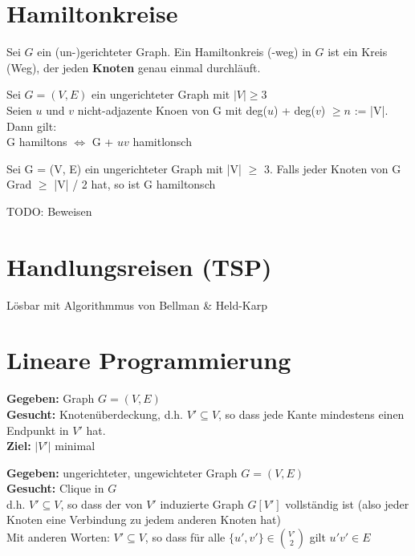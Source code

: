 \documentclass[14pt]{article}
\begin{document}
    \section{Hamiltonkreise}
    \begin{definition}
        Sei $G$ ein (un-)gerichteter Graph. Ein Hamiltonkreis (-weg)
        in $G$ ist ein Kreis (Weg), der jeden \textbf{Knoten} genau
        einmal durchläuft.
    \end{definition}
    \begin{eigenschaft}
        Sei $G = (V, E)$ ein ungerichteter Graph mit $|V| \geq 3$ \\
        Seien $u$ und $v$ nicht-adjazente Knoen von G mit deg($u$)
        + deg($v$) $\geq n$ := |V|. Dann gilt: \\
        \indent G hamiltons $\Leftrightarrow$ G + $uv$ hamitlonsch 
    \end{eigenschaft}
    \begin{eigenschaft}
        Sei G = (V, E) ein ungerichteter Graph mit |V| $\geq$ 3.
        Falls jeder Knoten von G Grad $\geq$ |V| / 2 hat, so ist 
        G hamiltonsch
    \end{eigenschaft}
    TODO: Beweisen

    \section{Handlungsreisen (TSP)}
    Lösbar mit Algorithmmus von Bellman \& Held-Karp

    \section{Lineare Programmierung}
        \begin{definition}[Knotenüberdeckung]
            \textbf{Gegeben:} Graph $G = (V, E)$ \\
            \textbf{Gesucht:} Knotenüberdeckung, d.h. $V' 
            \subseteq V$, so dass jede Kante mindestens einen 
            Endpunkt in $V'$ hat. \\
            \textbf{Ziel:} $|V'|$ minimal
        \end{definition}
        \begin{definition}[Clique]
            \textbf{Gegeben:} ungerichteter, ungewichteter Graph $G = (V, E)$ \\
            \textbf{Gesucht:} Clique in $G$ \\
            d.h. $V' \subseteq V$, so dass der von $V'$ induzierte Graph 
            $G[V']$ vollständig ist (also jeder Knoten eine Verbindung 
            zu jedem anderen Knoten hat) \\
            Mit anderen Worten: $V' \subseteq V$, so dass für alle $\{u', v'\}
            \in \binom{V'}{2}$ gilt $u'v' \in E$
        \end{definition}
\end{document}
